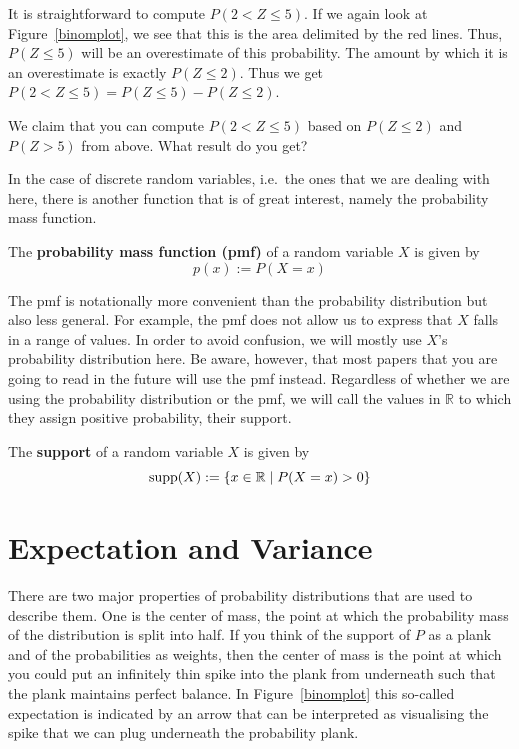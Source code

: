 It is straightforward to compute $ P(2 < Z \leq 5) $. If we again look at Figure~\ref{binomplot}, we see that this is
the area delimited by the red lines. Thus, $ P(Z \leq 5) $ will be an overestimate of this probability. The amount by
which it is an overestimate is exactly $ P(Z \leq 2) $. Thus we get $ P(2 < Z \leq 5) = P(Z \leq 5) - P(Z \leq 2) $.

\begin{Exercise}
We claim that you can compute $ P(2 < Z \leq 5) $ based on $ P(Z \leq 2) $ and $ P(Z > 5) $ from above. What result do
you get?
\end{Exercise}

In the case of discrete random variables, i.e.\ the ones that we are dealing with here, there is another function that is of great interest, namely the probability mass function.

\begin{Definition}
The \textbf{probability mass function (pmf)} of a random variable $ X $ is given by
$$ p(x) := P(X = x) $$
\end{Definition}

The pmf is notationally more convenient than the probability distribution but also less general. For example, the pmf does not
allow us to express that $ X $ falls in a range of values. In order to avoid confusion, we will mostly use $ X $'s 
probability distribution here. Be aware, however, that most papers that you are going to read in the future will use the pmf
instead. Regardless of whether we are using the probability distribution or the pmf, we will call the values in $ \mathbb{R} $
to which they assign positive probability, their support.

\begin{Definition}
The \textbf{support} of a random variable $ X $ is given by
$$ \operatorname{supp}(X) := \{x \in \mathbb{R} \mid P(X=x)>0 \} $$
\end{Definition}




\section{Expectation and Variance}

There are two major properties of probability distributions that are used to describe them. One is the center of mass, the point
at which the probability mass of the distribution is split into half. If you think of the support of $ P $ as a plank and 
of the probabilities as weights, then the center of mass is the point at which you could put an infinitely thin spike into the
plank from underneath such that the plank maintains perfect balance. In Figure~\ref{binomplot} this so-called expectation
is indicated by an arrow that can be interpreted as visualising the spike that we can plug underneath the probability plank.

